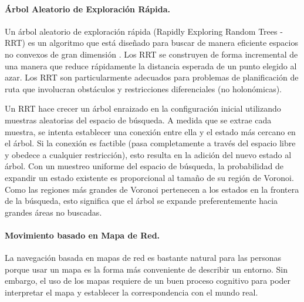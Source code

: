 \paragraph{Árbol Aleatorio de Exploración Rápida.} %
Un árbol aleatorio de exploración rápida (Rapidly Exploring Random Trees - RRT) es un 
algoritmo que está diseñado para buscar de manera eficiente espacios no convexos de gran 
dimensión \cite{bry2011rapidly}. Los RRT se construyen de forma incremental 
de una manera que reduce rápidamente la distancia esperada de un punto elegido 
al azar. Los RRT son particularmente adecuados para problemas de planificación 
de ruta que involucran obstáculos y restricciones diferenciales (no holonómicas).

Un RRT hace crecer un árbol enraizado en la configuración inicial utilizando 
muestras aleatorias del espacio de búsqueda. A medida que se extrae cada 
muestra, se intenta establecer una conexión entre ella y el estado más cercano 
en el árbol. Si la conexión es factible (pasa completamente a través del espacio 
libre y obedece a cualquier restricción), esto resulta en la adición del nuevo 
estado al árbol. Con un muestreo uniforme del espacio de búsqueda, la 
probabilidad de expandir un estado existente es proporcional al tamaño de su 
región de Voronoi. Como las regiones más grandes de Voronoi pertenecen a los 
estados en la frontera de la búsqueda, esto significa que el árbol se expande 
preferentemente hacia grandes áreas no buscadas. 

\paragraph{Movimiento basado en Mapa de Red.} %
\label{sec:MapRed}
La navegación basada en mapas de red es bastante natural para las personas 
porque usar un mapa es la forma más conveniente de describir un entorno. Sin 
embargo, el uso de los mapas requiere de un buen proceso cognitivo para poder 
interpretar el mapa y establecer la correspondencia con el mundo real.

